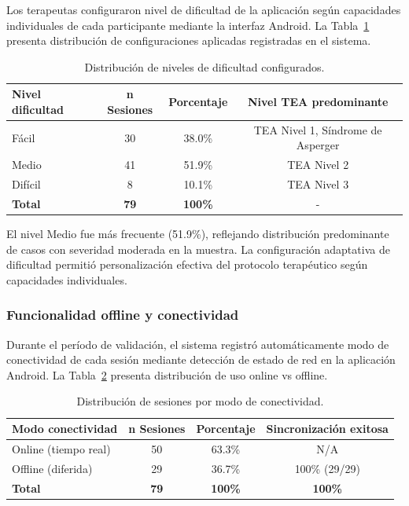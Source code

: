 \documentclass[journal,article,submit,pdftex,moreauthors]{Definitions/mdpi}
\begin{document}
	Los terapeutas configuraron nivel de dificultad de la aplicación según capacidades individuales de cada participante mediante la interfaz Android. La Tabla~\ref{tab12} presenta distribución de configuraciones aplicadas registradas en el sistema.
	
	\begin{table}[H]
		\caption{Distribución de niveles de dificultad configurados.\label{tab12}}
		\begin{tabularx}{\textwidth}{lccc}
			\toprule
			\textbf{Nivel dificultad} & \textbf{n Sesiones} & \textbf{Porcentaje} & \textbf{Nivel TEA predominante} \\
			\midrule
			Fácil & 30 & 38.0\% & TEA Nivel 1, Síndrome de Asperger \\
			Medio & 41 & 51.9\% & TEA Nivel 2 \\
			Difícil & 8 & 10.1\% & TEA Nivel 3 \\
			\textbf{Total} & \textbf{79} & \textbf{100\%} & - \\
			\bottomrule
		\end{tabularx}
	\end{table}
	
	El nivel Medio fue más frecuente (51.9\%), reflejando distribución predominante de casos con severidad moderada en la muestra. La configuración adaptativa de dificultad permitió personalización efectiva del protocolo terapéutico según capacidades individuales.
	
	\subsubsection{Funcionalidad offline y conectividad}
	
	Durante el período de validación, el sistema registró automáticamente modo de conectividad de cada sesión mediante detección de estado de red en la aplicación Android. La Tabla~\ref{tab13} presenta distribución de uso online vs offline.
	
	\begin{table}[H]
		\caption{Distribución de sesiones por modo de conectividad.\label{tab13}}
		\begin{tabularx}{\textwidth}{lccc}
			\toprule
			\textbf{Modo conectividad} & \textbf{n Sesiones} & \textbf{Porcentaje} & \textbf{Sincronización exitosa} \\
			\midrule
			Online (tiempo real) & 50 & 63.3\% & N/A \\
			Offline (diferida) & 29 & 36.7\% & 100\% (29/29) \\
			\textbf{Total} & \textbf{79} & \textbf{100\%} & \textbf{100\%} \\
			\bottomrule
		\end{tabularx}
	\end{table}
	
\end{document}
